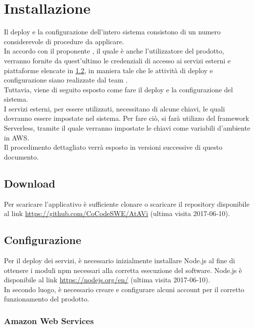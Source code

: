\section{Installazione}
Il deploy e la configurazione dell'intero sistema consistono di un numero considerevole di procedure da applicare.\\
In accordo con il proponente \PROPONENTE, il quale è anche l'utilizzatore del prodotto, verranno fornite da quest'ultimo le credenziali di accesso ai servizi esterni e piattaforme elencate in \ref{configurazione}, in maniera tale che le attività di deploy e configurazione siano realizzate dal team \GRUPPO.\\
Tuttavia, viene di seguito esposto come fare il deploy e la configurazione del sistema.\\
I servizi esterni, per essere utilizzati, necessitano di alcune chiavi, le quali dovranno essere impostate nel sistema. Per fare ciò, si farà utilizzo del framework Serverless, tramite il quale verranno impostate le chiavi come variabili d'ambiente in AWS.\\
Il procedimento dettagliato verrà esposto in versioni successive di questo documento.
\subsection{Download}\label{download}
Per scaricare l'applicativo è sufficiente clonare o scaricare il repository disponibile al link \url{https://github.com/CoCodeSWE/AtAVi} (ultima visita 2017-06-10).

\subsection{Configurazione}\label{configurazione}
Per il deploy dei servizi, è necessario inizialmente installare Node.js al fine di  ottenere i moduli npm necessari alla corretta esecuzione del software. Node.js è disponibile al link \url{https://nodejs.org/en/} (ultima visita 2017-06-10).\\In secondo luogo, è necessario creare e configurare alcuni account per il corretto funzionamento del prodotto.

\subsubsection{Amazon Web Services}\label{aws}
